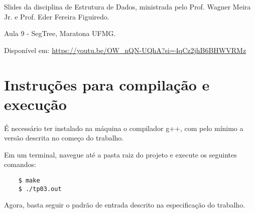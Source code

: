 \documentclass{article}
\begin{document}
Slides da disciplina de Estrutura de Dados, ministrada pelo Prof. Wagner Meira Jr. e Prof. Eder Fereira Figuiredo.


Aula 9 - SegTree, Maratona UFMG. 

Disponível em: \url{https://youtu.be/OW_nQN-UQhA?si=4qCz2jhB6BHWVRMz}

\section*{Instruções para compilação e execução}

É necessário ter instalado na máquina o compilador g++, com pelo mínimo a versão descrita no começo do trabalho.  

Em um terminal, navegue até a pasta raiz do projeto e execute os seguintes comandos:

\begin{verbatim}
    $ make
    $ ./tp03.out

\end{verbatim}

Agora, basta seguir o padrão de entrada descrito na especificação do trabalho.
\end{document}

